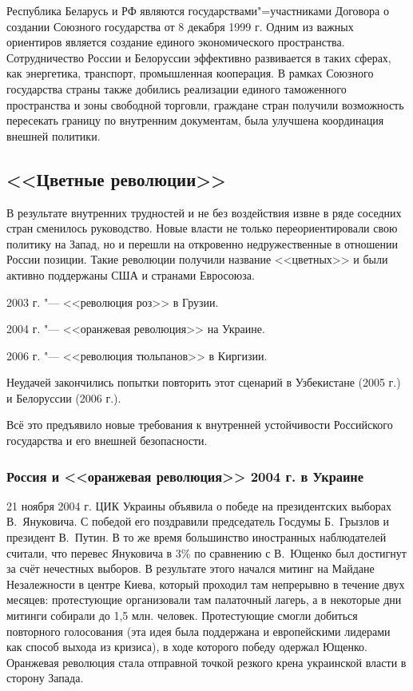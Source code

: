 Республика Беларусь и РФ являются государствами"=участниками Договора о создании Союзного государства от 8 декабря 1999 г. Одним из важных ориентиров является создание единого экономического пространства. Сотрудничество России и Белоруссии эффективно развивается в таких сферах, как энергетика, транспорт, промышленная кооперация. В рамках Союзного государства страны также добились реализации единого таможенного пространства и зоны свободной торговли, граждане стран получили возможность пересекать границу по внутренним документам, была улучшена координация внешней политики.

\subsection{<<Цветные революции>>}
В результате внутренних трудностей и не без воздействия извне в ряде соседних стран сменилось руководство. Новые власти не только переориентировали свою политику на Запад, но и перешли на откровенно недружественные в отношении России позиции. Такие революции получили название <<цветных>> и были активно поддержаны США и странами Евросоюза.

2003 г. "--- <<революция роз>> в Грузии.

2004 г. "--- <<оранжевая революция>> на Украине.

2006 г. "--- <<революция тюльпанов>> в Киргизии.

Неудачей закончились попытки повторить этот сценарий в Узбекистане (2005 г.) и Белоруссии (2006 г.).

Всё это предъявило новые требования к внутренней устойчивости Российского государства и его внешней безопасности.

\subsubsection{Россия и <<оранжевая революция>> 2004 г. в Украине}

21 ноября 2004 г. ЦИК Украины объявила о победе на президентских выборах В.~Януковича. С победой его поздравили председатель Госдумы Б.~Грызлов и президент В.~Путин. В то же время большинство иностранных наблюдателей считали, что перевес Януковича в 3\% по сравнению с В.~Ющенко был достигнут за счёт нечестных выборов. В результате этого начался митинг на Майдане Незалежности в центре Киева, который проходил там непрерывно в течение двух месяцев: протестующие организовали там палаточный лагерь, а в некоторые дни митинги собирали до 1,5 млн. человек. Протестующие смогли добиться повторного голосования (эта идея была поддержана и европейскими лидерами как способ выхода из кризиса), в ходе которого победу одержал Ющенко. Оранжевая революция стала отправной точкой резкого крена украинской власти в сторону Запада.

